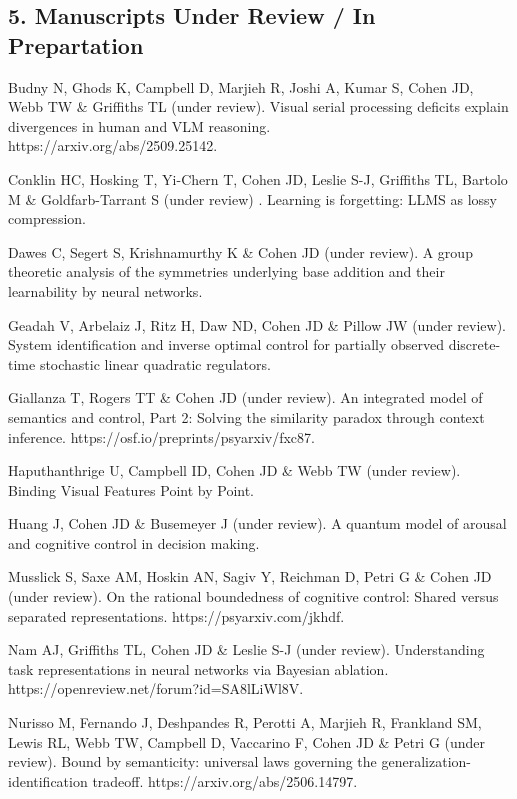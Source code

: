 \documentclass[10 pt]{article}
\begin{document}
\subsection*{5. Manuscripts Under Review / In Prepartation} \label{secPUBLICATIONS5}

Budny N, Ghods K, Campbell D, Marjieh R, Joshi A, Kumar S, Cohen JD, Webb TW \& Griffiths TL (under review). Visual
serial processing deficits explain divergences in human and VLM reasoning. \\ https://arxiv.org/abs/2509.25142.

Conklin HC, Hosking T, Yi-Chern T, Cohen JD, Leslie S-J, Griffiths TL, Bartolo M \& Goldfarb-Tarrant S (under review)
. Learning is forgetting: LLMS as lossy compression.

Dawes C, Segert S, Krishnamurthy K \& Cohen JD (under review). A group theoretic analysis of the symmetries underlying base addition and their learnability by neural networks.

Geadah V, Arbelaiz J, Ritz H, Daw ND, Cohen JD \& Pillow JW (under review). System identification and inverse optimal control for partially observed discrete-time stochastic linear quadratic regulators.

Giallanza T, Rogers TT \& Cohen JD (under review). An integrated model of semantics and control, Part 2: Solving the similarity paradox through context inference. https://osf.io/preprints/psyarxiv/fxc87.

Haputhanthrige U, Campbell ID, Cohen JD \& Webb TW (under review). Binding Visual Features Point by Point.

Huang J, Cohen JD \& Busemeyer J (under review). A quantum model of arousal and cognitive control in decision making.

Musslick S, Saxe AM, Hoskin AN, Sagiv Y, Reichman D, Petri G \& Cohen JD (under review). On the rational boundedness of cognitive control: Shared versus separated representations. https://psyarxiv.com/jkhdf.

Nam AJ, Griffiths TL, Cohen JD \& Leslie S-J (under review). Understanding task representations in neural networks via Bayesian ablation. https://openreview.net/forum?id=SA8lLiWl8V.

Nurisso M, Fernando J, Deshpandes R, Perotti A, Marjieh R, Frankland SM, Lewis RL, Webb TW, Campbell D, Vaccarino F, Cohen JD \& Petri G (under review). Bound by semanticity: universal laws governing the generalization-identification tradeoff. https://arxiv.org/abs/2506.14797.
\end{document}
